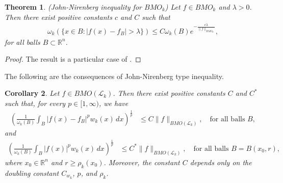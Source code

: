 \documentclass[11pt, reqno]{amsproc}
\newtheorem{theorem}{Theorem}[section]
\newtheorem{corollary}[theorem]{Corollary}
\theoremstyle{definition}
\theoremstyle{remark}
\numberwithin{equation}{section}
\begin{document}
\begin{theorem}\label{John-Nirenberg} 
(John-Nirenberg inequality for $BMO_k$) Let $f\in BMO_k$ and $\lambda>0$. Then there exist positive constants $c$ and $C$ such that 
\begin{align} \label{John-Nirenberg inequality}
    \omega_k\left(\{x\in B: |f(x) -f_B| > \lambda \}\right) \leq C \omega_k(B) e^{-\frac{c\lambda}{\|f\|_{BMO_k}}},
\end{align}
for all balls $B \subset \mathbb{R}^n$.     
\end{theorem}
\begin{proof}
    The result is a particular case of \cite[Theorem 5.2]{Alto-2011}.
\end{proof}
The following are the consequences of John-Nirenberg type inequality. 
\begin{corollary} \label{Corollary J-N}
Let $f \in BMO(\mathcal{L}_k)$. Then there exist positive constants $C$ and $C^*$ such that, for every $p \in [1,\infty)$, we have
\begin{align} \label{Corollary 5.4_1}
\left(\frac{1}{\omega_k(B)} \int_B |f(x)-f_B|^p w_k(x)\,dx \right)^{\frac{1}{p}}
& \leq C \|f\|_{BMO(\mathcal{L}_k)}, \quad \text{for all balls } B,
\end{align}
and
\begin{align} \label{corollary 5.4_2}
\left(\frac{1}{\omega_k(B)} \int_B |f(x)|^p w_k(x)\,dx \right)^{\frac{1}{p}}
& \leq C^* \|f\|_{BMO(\mathcal{L}_k)}, \quad \text{for all balls } B = B(x_0, r),
\end{align}
where $x_0 \in \mathbb{R}^n$ and $r \geq \rho_k(x_0)$. Moreover, the constant $C$ depends only on the doubling constant $C_{w_k}$, $p$, and $\rho_k$.
\end{corollary}
\end{document}
